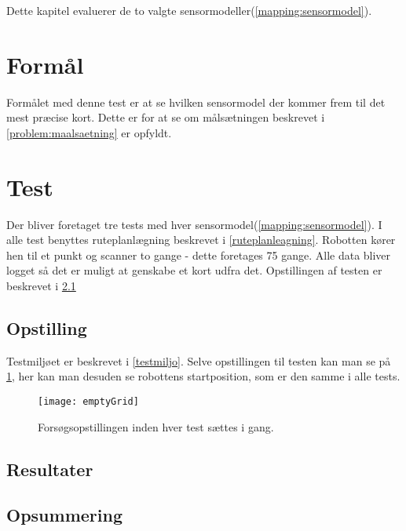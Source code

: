 Dette kapitel evaluerer de to valgte sensormodeller(\cref{mapping:sensormodel}).

\section{Formål}
Formålet med denne test er at se hvilken sensormodel der kommer frem til det mest præcise kort.
Dette er for at se om målsætningen beskrevet i \cref{problem:maalsaetning} er opfyldt.

\section{Test}\label{evaluering:test_beskrivelse}
Der bliver foretaget tre tests med hver sensormodel(\cref{mapping:sensormodel}).
I alle test benyttes ruteplanlægning beskrevet i \cref{ruteplanleagning}.
Robotten kører hen til et punkt og scanner to gange - dette foretages 75 gange.
Alle data bliver logget så det er muligt at genskabe et kort udfra det.
Opstillingen af testen er beskrevet i \cref{evaluering:opstilling}

\subsection{Opstilling}\label{evaluering:opstilling}
Testmiljøet er beskrevet i \cref{testmiljo}.
Selve opstillingen til testen kan man se på \cref{evaluering:emptyGrid}, her kan man desuden se robottens startposition, som er den samme i alle tests.

\begin{figure}[h]
\texttt{[image: emptyGrid]}
\caption{Forsøgsopstillingen inden hver test sættes i gang.}
\label{evaluering:emptyGrid}
\end{figure}
\subsection{Resultater}

\subsection{Opsummering}